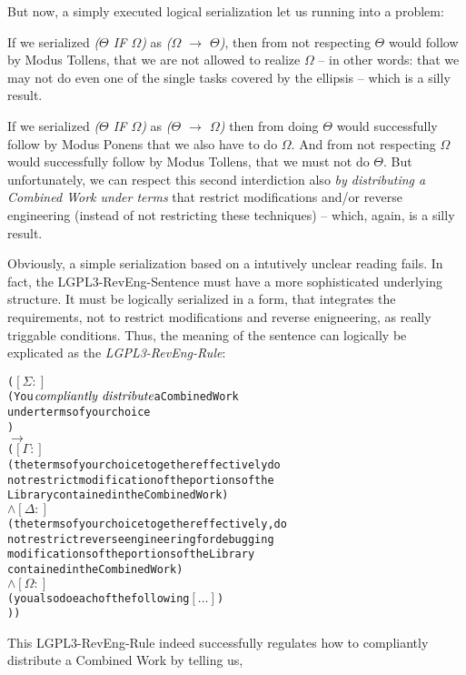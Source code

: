 But now, a simply executed logical serialization let us running into a problem:

If we serialized \emph{($\Theta$ IF $\Omega$)} as \emph{($\Omega$ $\rightarrow$
$\Theta$)}, then from not respecting $\Theta$ would follow by Modus Tollens,
that we are not allowed to realize $\Omega$ -- in other words:
that we may not do even one of the single tasks covered by the ellipsis -- which
is a silly result. 

If we serialized \emph{($\Theta$ IF $\Omega$)} as \emph{($\Theta$ $\rightarrow$
$\Omega$)} then from doing $\Theta$ would successfully follow by Modus Ponens
that we also have to do $\Omega$. And from not respecting $\Omega$ would
successfully follow by Modus Tollens, that we must not do $\Theta$. But
unfortunately, we can respect this second interdiction also \emph{by
distributing a Combined Work under terms} that restrict modifications and/or
reverse engineering (instead of not restricting these techniques) -- which,
again, is a silly result.

Obviously, a simple serialization based on a intutively unclear reading fails.
In fact, the LGPL3-RevEng-Sentence must have a more sophisticated underlying
structure. It must be logically serialized in a form, that integrates the
requirements, not to restrict modifications and reverse enigneering, as really
triggable conditions. Thus, the meaning of the sentence can logically be
explicated as the \emph{LGPL3-RevEng-Rule}:

\begin{alltt}
( \([\Sigma:]\)
  ( You \(\emph{compliantly distribute}\) a Combined Work 
    under terms of your choice 
  ) 
  \(\rightarrow\)  
  (    \([\Gamma:]\)
     ( the terms of your choice together effectively do 
       not restrict modification of the portions of the 
       Library contained in the Combined Work) 
     \(\wedge\) \([\Delta:]\)
     ( the terms of your choice together effectively, do 
       not restrict reverse engineering for debugging 
       modifications of the portions of the Library 
       contained in the Combined Work)
     \(\wedge\) \([\Omega:]\) 
     ( you also do each of the following \([\ldots]\))
) )
\end{alltt}  

This LGPL3-RevEng-Rule indeed successfully regulates how to compliantly
distribute a Combined Work by telling us,

